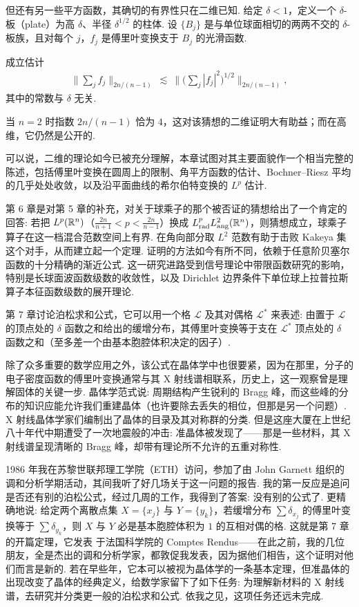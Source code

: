 但还有另一些平方函数，其确切的有界性只在二维已知. 给定 $\delta < 1$，定义一个 $\delta$-板（plate）为高 $\delta$、半径 $\delta^{1/2}$ 的柱体. 设 $\{B_j\}$ 是与单位球面相切的两两不交的 $\delta$-板族，且对每个 $j$，$f_j$ 是傅里叶变换支于 $B_j$ 的光滑函数.

\begin{conjecture*}[至上主义平方函数引理]
成立估计
\begin{align*}
  \Big\| \sum_j f_j \Big\|_{2n/(n-1)} \ \lesssim \
  \Big\| \Big( \sum_j |f_j|^2 \Big)^{1/2} \Big\|_{2n/(n-1)},
\end{align*}
其中的常数与 $\delta$ 无关.
\end{conjecture*}
当 $n = 2$ 时指数 $2n/(n-1)$ 恰为 $4$，这对该猜想的二维证明大有助益；而在高维，它仍然是公开的.

可以说，二维的理论如今已被充分理解，本章试图对其主要面貌作一个相当完整的陈述，包括傅里叶变换在圆周上的限制、角平方函数的估计、Bochner--Riesz 平均的几乎处处收敛，以及沿平面曲线的希尔伯特变换的 $L^p$ 估计.

第 6 章是对第 5 章的补充，对关于球乘子的那个被否证的猜想给出了一个肯定的回答: 若把 $L^p(\mathbb{R}^n)$（$\frac{2n}{n+1} < p < \frac{2n}{n-1}$）换成 $L^p_{\mathrm{rad}} L^2_{\mathrm{ang}}(\mathbb{R}^n)$，则猜想成立，球乘子算子在这一档混合范数空间上有界. 在角向部分取 $L^2$ 范数有助于击败 Kakeya 集这个对手，从而建立起一个定理. 证明的方法如今有所不同，依赖于任意阶贝塞尔函数的十分精确的渐近公式. 这一研究进路受到信号理论中带限函数研究的影响，特别是长球面波函数级数的收敛性，以及 Dirichlet 边界条件下单位球上拉普拉斯算子本征函数级数的展开理论.

第 7 章讨论泊松求和公式，它可以用一个格 $\mathcal{L}$ 及其对偶格 $\mathcal{L}^*$ 来表述: 由置于 $\mathcal{L}$ 的顶点处的 $\delta$ 函数之和给出的缓增分布，其傅里叶变换等于支在 $\mathcal{L}^*$ 顶点处的 $\delta$ 函数之和（至多差一个由基本胞腔体积决定的因子）.

除了众多重要的数学应用之外，该公式在晶体学中也很要紧，因为在那里，分子的电子密度函数的傅里叶变换通常与其 X 射线谱相联系，历史上，这一观察曾是理解固体的关键一步. 晶体学范式说: 周期结构产生锐利的 Bragg 峰，而这些峰的分布的知识应能允许我们重建晶体（也许要除去丢失的相位，但那是另一个问题）. X 射线晶体学家们编制出了晶体的目录及其对称群的分类. 但是这座大厦在上世纪八十年代中期遭受了一次地震般的冲击: 准晶体被发现了——那是一些材料，其 X 射线谱呈现清晰的 Bragg 峰，却带有理论所不允许的五重对称性.

1986 年我在苏黎世联邦理工学院（ETH）访问，参加了由 John Garnett 组织的调和分析学期活动，其间我听了好几场关于这一问题的报告. 我的第一反应是追问是否还有别的泊松公式，经过几周的工作，我得到了答案: 没有别的公式了. 更精确地说: 给定两个离散点集 $X = \{x_j\}$ 与 $Y = \{y_k\}$，若缓增分布 $\sum \delta_{x_j}$ 的傅里叶变换等于 $\sum \delta_{y_k}$，则 $X$ 与 $Y$ 必是基本胞腔体积为 $1$ 的互相对偶的格. 这就是第 7 章的开篇定理，它发表 \cite{b154} 于法国科学院的 Comptes Rendus——在此之前，我的几位朋友，全是杰出的调和分析学家，都敦促我发表，因为据他们相告，这个证明对他们而言是新的. 若在早些年，它本可以被视为晶体学的一条基本定理，但准晶体的出现改变了晶体的经典定义，给数学家留下了如下任务: 为理解新材料的 X 射线谱，去研究并分类更一般的泊松求和公式. 依我之见，这项任务还远未完成.

